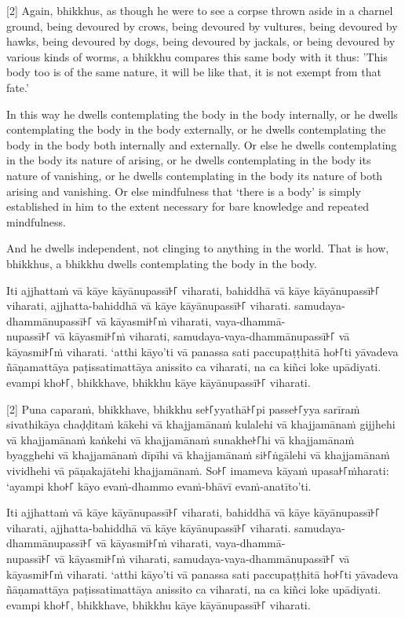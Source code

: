 [2] Again, bhikkhus, as though he were to see a corpse thrown aside in a charnel
ground, being devoured by crows, being devoured by vultures, being devoured by
hawks, being devoured by dogs, being devoured by jackals, or being devoured by
various kinds of worms, a bhikkhu compares this same body with it thus: 'This
body too is of the same nature, it will be like that, it is not exempt from that
fate.'

In this way he dwells contemplating the body in the body internally, or he
dwells contemplating the body in the body externally, or he dwells contemplating
the body in the body both internally and externally. Or else he dwells
contemplating in the body its nature of arising, or he dwells contemplating in
the body its nature of vanishing, or he dwells contemplating in the body its
nature of both arising and vanishing. Or else mindfulness that ‘there is a body’
is simply established in him to the extent necessary for bare knowledge and
repeated mindfulness.

And he dwells independent, not clinging to anything in the world. That is how,
bhikkhus, a bhikkhu dwells contemplating the body in the body.

\paliPage

Iti ajjhattaṁ vā kāye kāyānupassī꜔꜒ viharati, bahiddhā vā kāye kāyānupassī꜔꜒
viharati, ajjhatta-bahiddhā vā kāye kāyānupassī꜔꜒ viharati. samudaya-dhammānupassī꜔꜒
vā kāyasmi꜔꜒ṁ viharati, vaya-dhammā-\\
nupassī꜔꜒ vā kāyasmi꜔꜒ṁ viharati, samudaya-vaya-dhammānupassī꜔꜒ vā kāyasmi꜔꜒ṁ viharati.
‘atthi kāyo’ti vā panassa sati paccupaṭṭhitā ho꜔꜒ti yāvadeva ñāṇamattāya
paṭissatimattāya anissito ca viharati, na ca kiñci loke upādiyati. evampi kho꜔꜒,
bhikkhave, bhikkhu kāye kāyānupassī꜔꜒ viharati.

[2] Puna caparaṁ, bhikkhave, bhikkhu se꜔꜒yyathā꜔꜒pi passe꜔꜒yya sarīraṁ sivathikāya
chaḍḍitaṁ kākehi vā khajjamānaṁ kulalehi vā khajjamānaṁ gijjhehi vā khajjamānaṁ
kaṅkehi vā khajjamānaṁ sunakhe꜔꜒hi vā khajjamānaṁ byagghehi vā khajjamānaṁ dīpīhi
vā khajjamānaṁ si꜔꜒ṅgālehi vā khajjamānaṁ vividhehi vā pāṇakajātehi khajjamānaṁ.
So꜔꜒ imameva kāyaṁ upasa꜔꜒ṁharati: ‘ayampi kho꜔꜒ kāyo evaṁ-dhammo evaṁ-bhāvī
evaṁ-anatīto’ti.

Iti ajjhattaṁ vā kāye kāyānupassī꜔꜒ viharati, bahiddhā vā kāye kāyānupassī꜔꜒
viharati, ajjhatta-bahiddhā vā kāye kāyānupassī꜔꜒ viharati. samudaya-dhammānupassī꜔꜒
vā kāyasmi꜔꜒ṁ viharati, vaya-dhammā-\\
nupassī꜔꜒ vā kāyasmi꜔꜒ṁ viharati, samudaya-vaya-dhammānupassī꜔꜒ vā kāyasmi꜔꜒ṁ viharati.
‘atthi kāyo’ti vā panassa sati paccupaṭṭhitā ho꜔꜒ti yāvadeva ñāṇamattāya
paṭissatimattāya anissito ca viharati, na ca kiñci loke upādiyati. evampi kho꜔꜒,
bhikkhave, bhikkhu kāye kāyānupassī꜔꜒ viharati.

